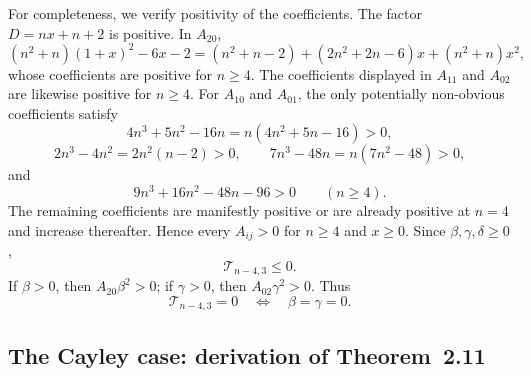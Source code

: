 \documentclass[11pt,reqno]{amsart}
\numberwithin{equation}{section}
\theoremstyle{definition}
\theoremstyle{remark}
\begin{document}
For completeness, we verify positivity of the coefficients.  The factor
$D=nx+n+2$ is positive.  In $A_{20}$,
\[
(n^2+n)(1+x)^2-6x-2
=(n^2+n-2)+(2n^2+2n-6)x+(n^2+n)x^2,
\]
whose coefficients are positive for $n\ge4$.  The coefficients displayed in
$A_{11}$ and $A_{02}$ are likewise positive for $n\ge4$.  For $A_{10}$ and
$A_{01}$, the only potentially non-obvious coefficients satisfy
\[
4n^3+5n^2-16n=n(4n^2+5n-16)>0,
\]
\[
2n^3-4n^2=2n^2(n-2)>0,
\qquad
7n^3-48n=n(7n^2-48)>0,
\]
and
\[
9n^3+16n^2-48n-96>0
\qquad(n\ge4).
\]
The remaining coefficients are manifestly positive or are already positive at
$n=4$ and increase thereafter.  Hence every $A_{ij}>0$ for $n\ge4$ and
$x\ge0$.  Since $\beta,\gamma,\delta\ge0$,
\[
\mathscr T_{n-4,3}\le0.
\]
If $\beta>0$, then $A_{20}\beta^2>0$; if $\gamma>0$, then
$A_{02}\gamma^2>0$.  Thus
\[
\mathscr T_{n-4,3}=0
\quad\Longleftrightarrow\quad
\beta=\gamma=0.
\]

\subsection{The Cayley case: derivation of Theorem~2.11}
\end{document}
